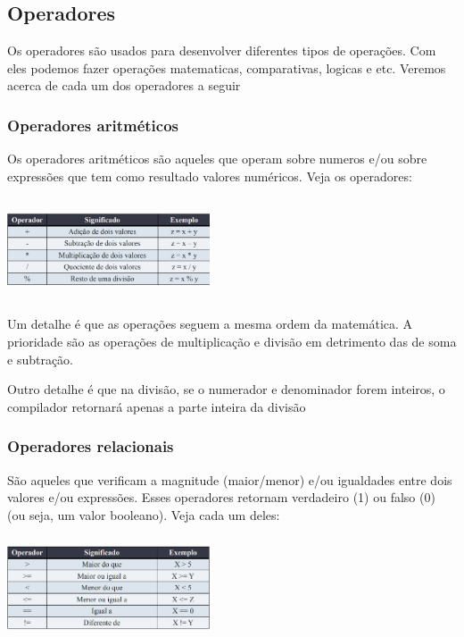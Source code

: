 \documentclass{report}
\begin{document}
	
	\subsection{Operadores}
	Os operadores são usados para desenvolver diferentes tipos de operações. Com eles podemos fazer operações matematicas, comparativas, logicas e etc. Veremos acerca de cada um dos operadores a seguir
	\subsubsection{Operadores aritméticos}
	Os operadores aritméticos são aqueles que operam sobre numeros e/ou sobre expressões que tem como resultado valores numéricos. Veja os operadores:
	
	\begin{center}
		
		\includegraphics[width=6cm,height=3cm,keepaspectratio=false]{imagens/operadoresa.png}
		
	\end{center}
	
	Um detalhe é que as operações seguem a mesma ordem da matemática. A prioridade são as operações de multiplicação e divisão em detrimento das de soma e subtração.
	
	Outro detalhe é que na divisão, se o numerador e denominador forem inteiros, o compilador retornará apenas a parte inteira da divisão
	
	\subsubsection{Operadores relacionais}
	São aqueles que verificam a magnitude (maior/menor) e/ou igualdades entre dois valores e/ou expressões. Esses operadores retornam verdadeiro (1) ou falso (0) (ou seja, um valor booleano). Veja cada um deles:
	
	\begin{center}
		
		\includegraphics[width=6cm,height=3cm,keepaspectratio=false]{imagens/relacionais.png}
		
	\end{center}
	
\end{document}
